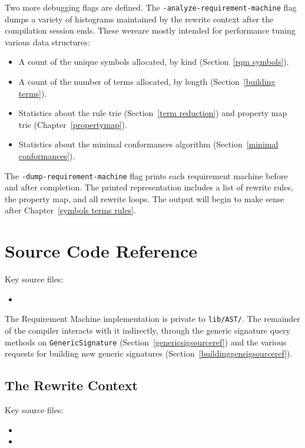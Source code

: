 \documentclass[../generics]{subfiles}
\begin{document}
Two more debugging flags are defined. The \texttt{-analyze-requirement-machine} flag dumps a variety of histograms maintained by the rewrite context after the compilation session ends. These wereare mostly intended for performance tuning various data structures:
\begin{itemize}
\item A count of the unique symbols allocated, by kind (Section~\ref{rqm symbols}).
\item A count of the number of terms allocated, by length (Section~\ref{building terms}).
\item Statistics about the rule trie (Section~\ref{term reduction}) and property map trie (Chapter~\ref{propertymap}).
\item Statistics about the minimal conformances algorithm (Section~\ref{minimal conformances}).
\end{itemize}

The \texttt{-dump-requirement-machine} flag prints each requirement machine before and after completion. The printed representation includes a list of rewrite rules, the property map, and all rewrite loops. The output will begin to make sense after Chapter~\ref{symbols terms rules}.

\section{Source Code Reference}\label{rqm basic operation source ref}

Key source files:
\begin{itemize}
\item {}
\end{itemize}
The Requirement Machine implementation is private to \texttt{lib/AST/}. The remainder of the compiler interacts with it indirectly, through the generic signature query methods on \texttt{GenericSignature} (Section~\ref{genericsigsourceref}) and the various requests for building new generic signatures (Section~\ref{buildinggensigsourceref}).

\subsection*{The Rewrite Context}

Key source files:
\begin{itemize}
\item {}
\item {}
\end{itemize}
\end{document}
